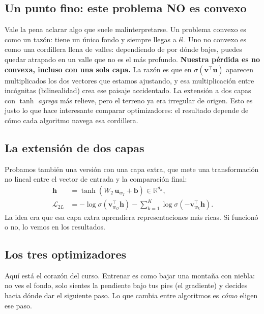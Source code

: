 \documentclass[11pt]{article}
\begin{document}
\subsection{Un punto fino: este problema NO es convexo}\label{sec:convexidad}
Vale la pena aclarar algo que suele malinterpretarse. Un problema convexo es como un tazón:
tiene un único fondo y siempre llegas a él. Uno no convexo es como una cordillera llena de
valles: dependiendo de por dónde bajes, puedes quedar atrapado en un valle que no es el más
profundo. \textbf{Nuestra pérdida es no convexa, incluso con una sola capa.} La razón es que
en $\sigma(\mathbf{v}^{\top}\mathbf{u})$ aparecen multiplicados los dos vectores que estamos
ajustando, y esa multiplicación entre incógnitas (bilinealidad) crea ese paisaje accidentado.
La extensión a dos capas con $\tanh$ \emph{agrega} más relieve, pero el terreno ya era
irregular de origen. Esto es justo lo que hace interesante comparar optimizadores: el
resultado depende de cómo cada algoritmo navega esa cordillera.

\subsection{La extensión de dos capas}
Probamos también una versión con una capa extra, que mete una transformación no lineal entre
el vector de entrada y la comparación final:
\begin{align}
\mathbf{h} &= \tanh(W_2\,\mathbf{u}_{w_I}+\mathbf{b})\in\mathbb{R}^{d_h},\\
\mathcal{L}_{2L} &= -\log\sigma\!\left(\mathbf{v}_{w_O}^{\top}\mathbf{h}\right)
- \sum_{k=1}^{K}\log\sigma\!\left(-\mathbf{v}_{w_k}^{\top}\mathbf{h}\right).
\end{align}
La idea era que esa capa extra aprendiera representaciones más ricas. Si funcionó o no, lo
vemos en los resultados.

\subsection{Los tres optimizadores}
Aquí está el corazón del curso. Entrenar es como bajar una montaña con niebla: no ves el
fondo, solo sientes la pendiente bajo tus pies (el gradiente) y decides hacia dónde dar el
siguiente paso. Lo que cambia entre algoritmos es \emph{cómo} eligen ese paso.
\end{document}
